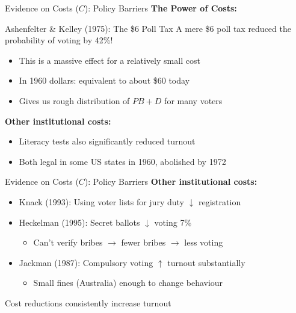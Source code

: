 \documentclass[10pt]{beamer}
\begin{document}
\begin{frame}{Evidence on Costs ($C$): Policy Barriers}
\textbf{The Power of Costs:}

\begin{alertblock}{Ashenfelter \& Kelley (1975): The \$6 Poll Tax}
A mere \$6 poll tax reduced the probability of voting by \alert{42\%}!
\begin{itemize}
\item This is a massive effect for a relatively small cost
\item In 1960 dollars: equivalent to about \$60 today
\item Gives us rough distribution of $PB + D$ for many voters
\end{itemize}
\end{alertblock}



\textbf{Other institutional costs:}
\begin{itemize}
\item Literacy tests also significantly reduced turnout
\item Both legal in some US states in 1960, abolished by 1972
\end{itemize}
\end{frame}
\begin{frame}{Evidence on Costs ($C$): Policy Barriers}
\textbf{Other institutional costs:}
\begin{itemize}
\item Knack (1993): Using voter lists for jury duty $\downarrow$ registration
\item Heckelman (1995): Secret ballots $\downarrow$ voting 7\%
\begin{itemize}
\item Can't verify bribes $\rightarrow$ fewer bribes $\rightarrow$ less voting
\end{itemize}
\item Jackman (1987): Compulsory voting $\uparrow$ turnout substantially
\begin{itemize}
\item Small fines (Australia) enough to change behaviour
\end{itemize}
\end{itemize}
Cost reductions consistently increase turnout
\end{frame}
\end{document}
